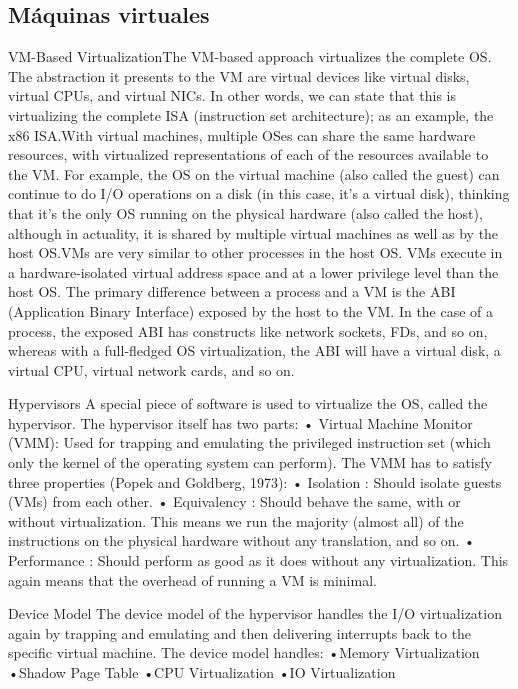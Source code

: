 \subsection{Máquinas virtuales}
VM-Based  VirtualizationThe VM-based approach virtualizes the complete OS. The abstraction
 it presents to the VM are virtual devices like virtual disks, virtual CPUs, and virtual 
 NICs. In other words, we can state that this is virtualizing the complete ISA
  (instruction set architecture); as an example, the x86 ISA.With virtual machines,
   multiple OSes can share the same hardware resources, with virtualized representations 
   of each of the resources available to the VM. For example, the OS on the virtual
    machine (also called the guest) can continue to do I/O operations on a disk 
    (in this case, it’s a virtual disk), thinking that it’s the only OS running on the 
    physical hardware (also called the host), although in actuality, it is shared by 
    multiple virtual machines as well as by the host OS.VMs are very similar to other 
    processes in the host OS. VMs execute in a hardware-isolated virtual address space 
    and at a lower privilege level than the host OS. The primary difference between a
     process and a VM is the ABI (Application Binary Interface) exposed by the host
      to the VM. In the case of a process, the exposed ABI has constructs like network 
      sockets, FDs, and so on, whereas with a full-fledged OS virtualization, the ABI 
      will have a virtual disk, a virtual CPU, virtual network cards, and so on.

Hypervisors
A special piece of software is used to virtualize the OS, called the hypervisor. The 
hypervisor itself has two parts:
• Virtual Machine Monitor (VMM): Used for trapping and emulating the privileged 
instruction set (which only the kernel of the operating system can perform).
The VMM has to satisfy three properties (Popek and Goldberg, 1973):
    • Isolation :  
Should isolate guests (VMs) from each other.
    • Equivalency : Should behave the same, 
with or without virtualization. This means we run the majority (almost all) of the 
instructions on the physical hardware without any translation, and so on.
    • Performance : 
Should perform as good as it does without any virtualization. This again means that 
the overhead of running a VM is minimal.

Device  Model
The device model of the hypervisor handles the I/O virtualization again by trapping 
and emulating and then delivering interrupts back to the specific virtual machine.
The device model handles:
•Memory  Virtualization
•Shadow Page Table
•CPU  Virtualization
•IO  Virtualization

